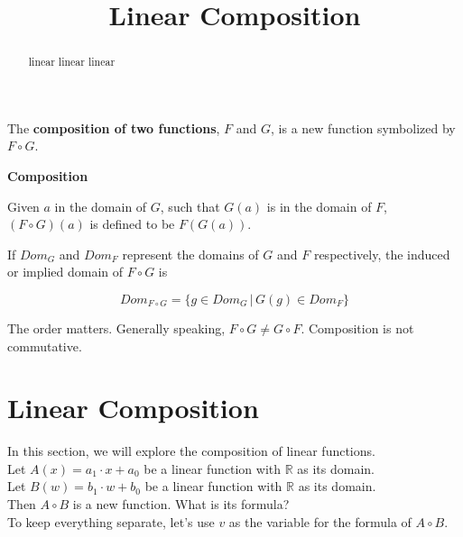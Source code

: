 \documentclass{ximera}
\title{Linear Composition}
\begin{document}
\begin{abstract}
linear linear linear
\end{abstract}
\maketitle


The \textbf{composition of two functions}, $F$ and $G$, is a new function symbolized by $F \circ G$.


\begin{definition} \textbf{\textcolor{green!50!black}{Composition}} 


Given $a$ in the domain of $G$, such that $G(a)$ is in the domain of $F$, $(F \circ G)(a)$ is defined to be  $F(G(a))$.


If $Dom_G$ and $Dom_F$ represent the domains of $G$ and $F$ respectively, the induced or implied domain of $F \circ G$ is 




\[  Dom_{F \circ G} = \{  g \in  Dom_G  \,   |   \,   G(g) \in Dom_F                 \}           \]

\end{definition}

The order matters.  Generally speaking, $F \circ G \ne G \circ F$. Composition is not commutative.


















\section{Linear Composition}

In this section, we will explore the composition of linear functions. \\


Let $A(x) = a_1 \cdot x + a_0$ be a linear function with $\mathbb{R}$ as its domain. \\
Let $B(w) = b_1 \cdot w + b_0$ be a linear function with $\mathbb{R}$ as its domain. \\


Then $A \circ B$ is a new function. What is its formula? \\

To keep everything separate, let's use $v$ as the variable for the formula of $A \circ B$.
\end{document}
